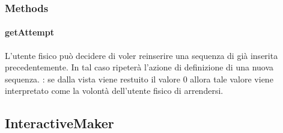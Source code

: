 \documentclass[letterpaper,10pt,italian,openany,oneside]{sphinxmanual}
\begin{document}
\subsubsection{Methods}
\label{\detokenize{source/it/unicam/cs/pa/mastermind/players/InteractiveBreaker:methods}}

\paragraph{getAttempt}
\label{\detokenize{source/it/unicam/cs/pa/mastermind/players/InteractiveBreaker:getattempt}}

\begin{fulllineitems}
\label{\detokenize{source/it/unicam/cs/pa/mastermind/players/InteractiveBreaker:it.unicam.cs.pa.mastermind.players.InteractiveBreaker.getAttempt()}}
L’utente fisico può decidere di voler reinserire una sequenza di  già inserita precedentemente. In tal caso ripeterà l’azione di definizione di una nuova sequenza. : se dalla vista  viene restuito il valore 0 allora tale valore viene interpretato come la volontà dell’utente fisico di arrendersi.

\end{fulllineitems}



\subsection{InteractiveMaker}
\label{\detokenize{source/it/unicam/cs/pa/mastermind/players/InteractiveMaker:interactivemaker}}\label{\detokenize{source/it/unicam/cs/pa/mastermind/players/InteractiveMaker::doc}}
\end{document}
